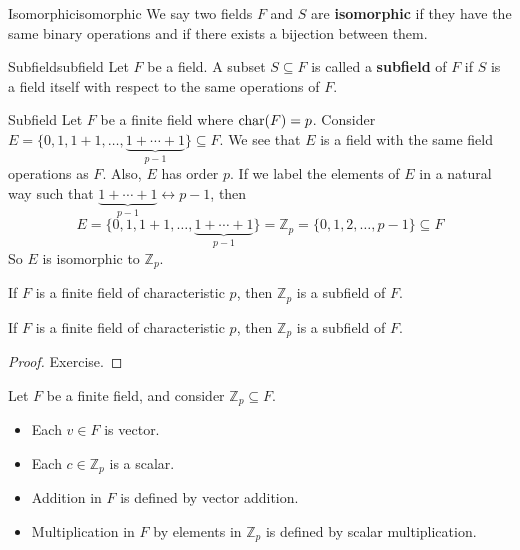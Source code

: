 
\begin{Definition}{Isomorphic}{isomorphic}
    We say two fields $F$ and $S$ are \textbf{isomorphic} if they have the same
    binary operations and if there exists a bijection between them.
\end{Definition}

\begin{Definition}{Subfield}{subfield}
    Let $ F $ be a field. A subset $ S\subseteq F $ is called a \textbf{subfield}
    of $ F $ if $ S $ is a field itself with respect to the same operations
    of $ F $.
\end{Definition}

\begin{Example}{Subfield}{}
    Let $ F $ be a finite field where $ \operatorname{char}(F)=p $. Consider
    $ E=\{0,1,1+1,\ldots,\underbrace{1+\cdots+1}_{p-1}\}\subseteq F $.
    We see that $ E $ is a field with the same field operations as $ F $.
    Also, $ E $ has order $ p $. If we label the elements of $ E $
    in a natural way such that $ \underbrace{1+\cdots+1}_{p-1}
        \longleftrightarrow p-1 $,
    then
    \[ E=\{0,1,1+1,\ldots,\underbrace{1+\cdots+1}_{p-1}\}
        = \mathbb{Z}_p= \{0,1,2,\ldots ,p-1\}\subseteq F \]
    So $ E $ is isomorphic to $ \mathbb{Z}_p $.
\end{Example}

\begin{Theorem}{}{}
    If $ F $ is a finite field of characteristic $ p $, then
    $ \mathbb{Z}_p $ is a subfield of $ F $.
\end{Theorem}

\begin{Theorem}{}{}
    If $ F $ is a finite field of characteristic $ p $, then
    $ \mathbb{Z}_p $ is a subfield of $ F $.
\end{Theorem}

\begin{proof}
    Exercise.
\end{proof}

\begin{Definition}{}{}
    Let $ F $ be a finite field, and consider $ \mathbb{Z}_p\subseteq F $.
    \begin{itemize}
        \item Each $ v\in F $ is vector.
        \item Each $ c\in\mathbb{Z}_p $ is a scalar.
        \item Addition in $ F $ is defined by vector addition.
        \item Multiplication in $ F $ by elements in $ \mathbb{Z}_p $
              is defined by scalar multiplication.
    \end{itemize}
\end{Definition}

